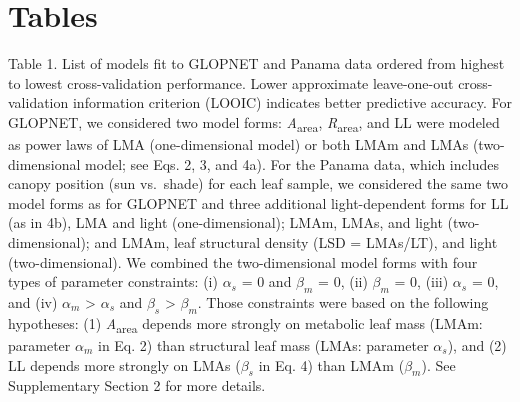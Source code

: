 \documentclass[
  12pt,
  letterpaper,
  DIV=11,
  numbers=noendperiod]{scrartcl}
\begin{document}
\newpage

\section{Tables}\label{tables}

Table 1. List of models fit to GLOPNET and Panama data ordered from
highest to lowest cross-validation performance. Lower approximate
leave-one-out cross-validation information criterion (LOOIC) indicates
better predictive accuracy. For GLOPNET, we considered two model forms:
\emph{A}\textsubscript{area}, \emph{R}\textsubscript{area}, and LL were
modeled as power laws of LMA (one-dimensional model) or both LMAm and
LMAs (two-dimensional model; see Eqs. 2, 3, and 4a). For the Panama
data, which includes canopy position (sun vs.~shade) for each leaf
sample, we considered the same two model forms as for GLOPNET and three
additional light-dependent forms for LL (as in 4b), LMA and light
(one-dimensional); LMAm, LMAs, and light (two-dimensional); and LMAm,
leaf structural density (LSD = LMAs/LT), and light (two-dimensional). We
combined the two-dimensional model forms with four types of parameter
constraints: (i) \(\alpha_s\) = 0 and \(\beta_m\) = 0, (ii) \(\beta_m\)
= 0, (iii) \(\alpha_s\) = 0, and (iv) \(\alpha_m\) \textgreater{}
\(\alpha_s\) and \(\beta_s\) \textgreater{} \(\beta_m\). Those
constraints were based on the following hypotheses: (1)
\emph{A}\textsubscript{area} depends more strongly on metabolic leaf
mass (LMAm: parameter \(\alpha_m\) in Eq. 2) than structural leaf mass
(LMAs: parameter \(\alpha_s\)), and (2) LL depends more strongly on LMAs
(\(\beta_s\) in Eq. 4) than LMAm (\(\beta_m\)). See Supplementary
Section 2 for more details.
\end{document}
